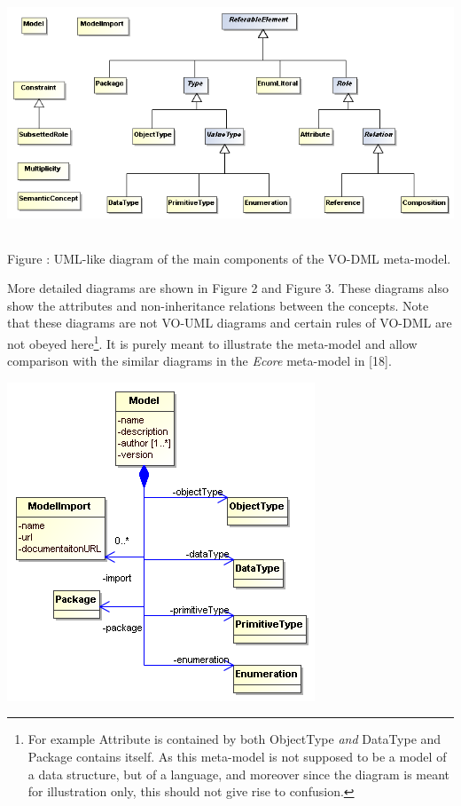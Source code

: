 \documentclass[10pt,a4paper]{ivoa}
\begin{document}
\includegraphics[width=6in,height=2.83302in]{./media/image4.png}

Figure : UML-like diagram of the main components of the VO-DML
meta-model.

More detailed diagrams are shown in Figure 2 and Figure 3. These
diagrams also show the attributes and non-inheritance relations between
the concepts. Note that these diagrams are not VO-UML diagrams and
certain rules of VO-DML are not obeyed here\footnote{For example
  Attribute is contained by both ObjectType \emph{and} DataType and
  Package contains itself. As this meta-model is not supposed to be a
  model of a data structure, but of a language, and moreover since the
  diagram is meant for illustration only, this should not give rise to
  confusion.}. It is purely meant to illustrate the meta-model and allow
comparison with the similar diagrams in the \emph{Ecore} meta-model in
{[}18{]}.

\includegraphics[width=3.61458in,height=3.73958in]{./media/image5.png}
\end{document}
